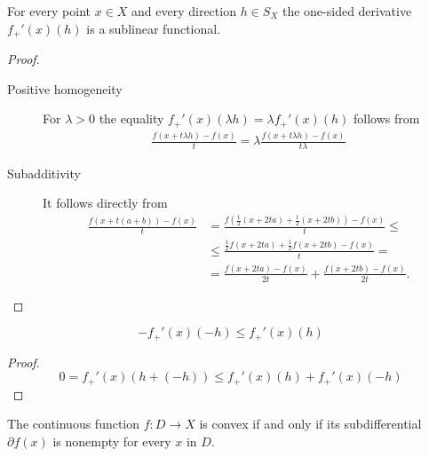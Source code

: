 \begin{proposition}\label{thm:convex_one_sided_derivatives_sublinear}
  For every point \( x \in X \) and every direction \( h \in S_X \) the one-sided derivative \( f_+'(x)(h) \) is a sublinear functional.
\end{proposition}
\begin{proof}\mbox{} %
  \begin{description}
    \item[Positive homogeneity] For \( \lambda > 0 \) the equality \( f_+'(x)(\lambda h) = \lambda f_+'(x)(h) \) follows from
    \begin{align*}
      \frac {f(x + t \lambda h) - f(x)} t
      =
      \lambda \frac {f(x + t \lambda h) - f(x)} {t \lambda}
    \end{align*}

    \item[Subadditivity] It follows directly from
    \begin{align*}
      \frac {f(x + t(a + b)) - f(x)} t
      &=
      \frac {f(\tfrac 1 2 (x + 2ta) + \tfrac 1 2 (x + 2tb)) - f(x)} t
      \leq \\ &\leq
      \frac {\tfrac 1 2 f(x + 2ta) + \tfrac 1 2 f(x + 2tb) - f(x)} t
      = \\ &=
      \frac {f(x + 2ta) - f(x)} {2t} + \frac {f(x + 2tb) - f(x)} {2t}.
    \end{align*}
  \end{description}
\end{proof}

\begin{corollary}\label{thm:convex_one_sided_derivative_negative_inequality}
  \begin{equation*}
    -f_+'(x)(-h) \leq f_+'(x)(h)
  \end{equation*}
\end{corollary}
\begin{proof}
  \begin{equation*}
      0 = f_+'(x)(h + (-h)) \leq f_+'(x)(h) + f_+'(x)(-h)
  \end{equation*}
\end{proof}

\begin{proposition}\label{thm:convex_iff_subdifferential_nonempty}
  The continuous function \( f: D \to X \) is convex if and only if its subdifferential \( \partial f(x) \) is nonempty for every \( x \) in \( D \).
\end{proposition}

